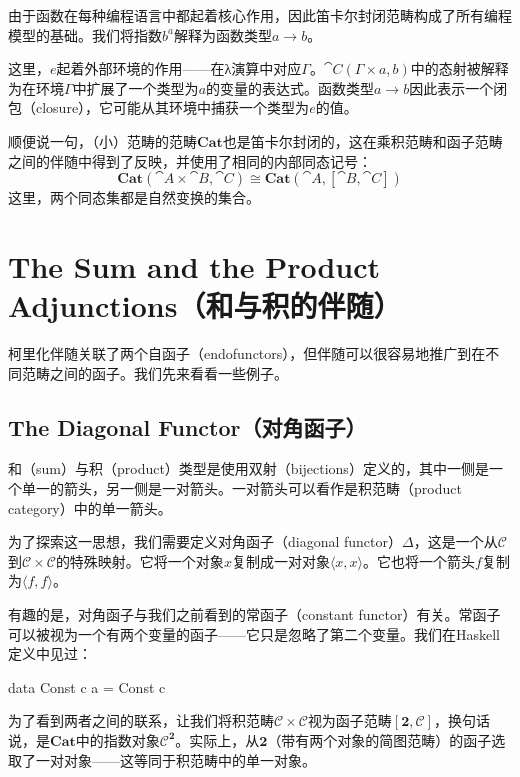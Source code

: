 \documentclass[DaoFP]{subfiles}
\begin{document}
    由于函数在每种编程语言中都起着核心作用，因此笛卡尔封闭范畴构成了所有编程模型的基础。我们将指数$b^a$解释为函数类型$a \to b$。

    这里，$e$起着外部环境的作用——在λ演算中对应$\Gamma$。$\cat C(\Gamma \times a, b)$中的态射被解释为在环境$\Gamma$中扩展了一个类型为$a$的变量的表达式。函数类型$a \to b$因此表示一个闭包（closure），它可能从其环境中捕获一个类型为$e$的值。

    顺便说一句，（小）范畴的范畴$\mathbf{Cat}$也是笛卡尔封闭的，这在乘积范畴和函子范畴之间的伴随中得到了反映，并使用了相同的内部同态记号：
    \[ \mathbf{Cat} (\cat A \times \cat B, \cat C) \cong \mathbf{Cat} (\cat A, [\cat B, \cat C]) \]
    这里，两个同态集都是自然变换的集合。

    \section{The Sum and the Product Adjunctions（和与积的伴随）}

    柯里化伴随关联了两个自函子（endofunctors），但伴随可以很容易地推广到在不同范畴之间的函子。我们先来看看一些例子。

    \subsection{The Diagonal Functor（对角函子）}

    和（sum）与积（product）类型是使用双射（bijections）定义的，其中一侧是一个单一的箭头，另一侧是一对箭头。一对箭头可以看作是积范畴（product category）中的单一箭头。

    为了探索这一思想，我们需要定义对角函子（diagonal functor）$\Delta$，这是一个从$\mathcal{C}$到$\mathcal{C} \times \mathcal{C}$的特殊映射。它将一个对象$x$复制成一对对象$\langle x, x \rangle$。它也将一个箭头$f$复制为$\langle f, f \rangle$。

    有趣的是，对角函子与我们之前看到的常函子（constant functor）有关。常函子可以被视为一个有两个变量的函子——它只是忽略了第二个变量。我们在Haskell定义中见过：
    \begin{haskell}
        data Const c a = Const c
    \end{haskell}

    为了看到两者之间的联系，让我们将积范畴$\mathcal{C} \times \mathcal{C}$视为函子范畴$[\mathbf{2}, \mathcal{C}]$，换句话说，是$\mathbf{Cat}$中的指数对象$\mathcal{C}^{\mathbf{2}}$。实际上，从$\mathbf{2}$（带有两个对象的简图范畴）的函子选取了一对对象——这等同于积范畴中的单一对象。
\end{document}
